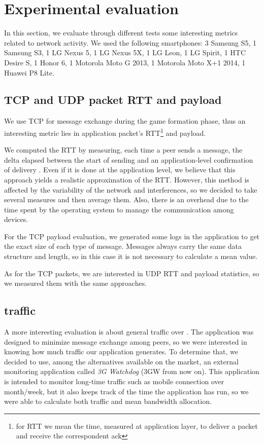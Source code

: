 \section{Experimental evaluation}

In this section, we evaluate through different tests some interesting metrics
related to network activity. We used the following smartphones: 3 Samsung S5,
1 Samsung S3, 1 LG Nexus 5, 1 LG Nexus 5X, 1 LG Leon, 1 LG Spirit, 1 HTC Desire
S, 1 Honor 6, 1 Motorola Moto G 2013, 1 Motorola Moto X+1 2014, 1 Huawei P8
Lite.

\subsection{TCP and UDP packet RTT and payload}
We use TCP for message exchange during the game formation phase, thus an interesting metric lies in application packet's RTT\footnote{for RTT we mean the time, measured at application layer, to deliver a packet and receive the correspondent ack} and payload.

We computed the RTT by measuring, each time a peer sends a message, the delta
elapsed between the start of sending and an application-level confirmation of
delivery . Even if it is done at the application level, we believe that this
approach yields a realistic approximation of the RTT.
However, this method is affected by the variability of the network and
interferences, so we decided to take several measures and then average them.
Also, there is an overhead due to the time spent by the operating system to
manage the communication among devices.

For the TCP payload evaluation, we generated some logs in the application to get the exact size of each type of message. Messages always carry the same data structure and length, so in this case it is not necessary to calculate a mean value.

As for the TCP packets, we are interested in UDP RTT and payload statistics, so we measured them with the same approaches.

\subsection{\wifi{} traffic}

A more interesting evaluation is about general traffic over \wifi. The application was designed to minimize message exchange among peers, so we were interested in knowing how much traffic our application generates. To determine that, we decided to use, among the alternatives available on the market, an external monitoring application called \textit{3G Watchdog} (3GW from now on). This application is intended to monitor long-time traffic such as mobile connection over month/week, but it also keeps track of the time the application has run, so we were able to calculate both traffic and mean bandwidth allocation.

